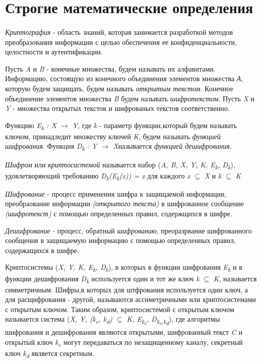 \section{Строгие математические определения}

\paragraph{} \textit{Криптография} - область знаний, которая занимается разработкой методов преобразования информации с целью обеспечения ее конфиденциальности, целостности и аутентификации.

Пусть \textit{A} и \textit{B}  - конечные множества, будем называть их алфавитами. Информацию, состоящую из конечного объединения элементов множества \textit{А}, которую будем защищать, будем называть \textit{открытым текстом}. Конечное объединение элементов множества \textit{B} будем называть \textit{шифротекстом}. Пусть \textit{X} и \textit{Y} - множества открытых текстов и шифрованых текстов соответственно.

Функцию \textit{E\textsubscript{k} : \textit{X} {$\rightarrow$} \textit{Y}}, где \textit{k} - параметр функции,который будем называть ключом, принадледит множеству ключей \textit{K}, будем называть \textit{функцией шифрования}. Функция \textit{D\textsubscript{k} : \textit{Y} {$\rightarrow$} \textit{X}}называется \textit{функцией дешифрования}.

\textit{Шифром} или \textit{криптосистемой} называется набор (\textit{A, B, X, Y, K, E\textsubscript{k}, D\textsubscript{k}}), удовлетворяющий требованию \textit{D\textsubscript{k}(E\textsubscript{k}(x)) = x} для каждого \textit{x} {$\subseteq$} \textit{X} и \textit{k} {$\subseteq$} \textit{K}

\textit{Шифрование} - процесс применения шифра к защищаемой информации, преобраование информации \textit{(открытого текста)} в шифрованное сообщение \textit{(шифротекст)} с помощью определенных правил, содержщихся в шифре.

\textit{Дешифрование} - процесс, обратный \textit{шифрованию}, преоразрвание шифрованного сообщения в защищаемую информацию с помощью определенных правил, содержащихся в шифре.

Криптосистемы (\textit{X, Y, K, E\textsubscript{k}, D\textsubscript{k}}), в которых в функции шифрования \textit{E\textsubscript{k}} и в функции дешифрования \textit{D\textsubscript{k}} используется один и тот же ключ \textit{k} {$\subseteq$} \textit{K}, называется симметричным. Шифры,в которых для штфрования используется один ключ, а для расщифрования - другой, называются ассиметричными или криптосистемами с открытым ключом. Таким образом, криптосистемой с открытым ключом называется система (\textit{X, Y, (k\textsubscript{e}, k\textsubscript{d}) {$\subseteq$} K, E\textsubscript{k\textsubscript{e}}, D\textsubscript{k\textsubscript{e},k\textsubscript{d}}}), где алгоритмы шифрования и дешифрования являются открытыми, шифрованный текст \textit{C} и открытый ключ \textit{k\textsubscript{e}} могут передаваться по незащищенному каналу, секретный ключ \textit{k\textsubscript{d}} является секретным.

